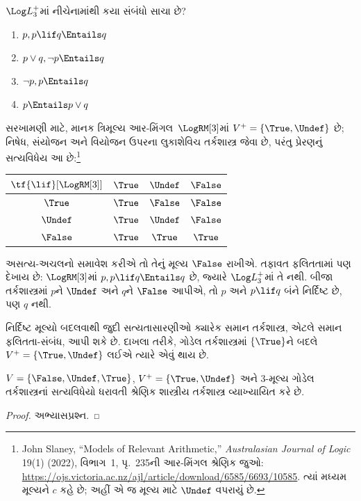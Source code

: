 \documentclass[../../../include/open-logic-section]{subfiles}
\begin{document}
\begin{prob}
  $\Log L_3^{+}$માં નીચેનામાંથી કયા સંબંધો સાચા છે?
  \begin{enumerate}
    \item $p, p \lif q \Entails q$
    \item $p \lor q, \lnot p \Entails q$
    \item $\lnot p, p \Entails q$
    \item $p \Entails p \lor q$
  \end{enumerate}
\end{prob}

સરખામણી માટે, માનક ત્રિમૂલ્ય આર-મિંગલ~$\LogRM[3]$માં
$V^+=\{\True,\Undef\}$ છે; નિષેધ, સંયોજન અને વિયોજન
ઉપરના લુકાશેવિચ તર્કશાસ્ત્ર જેવા છે, પરંતુ પ્રેરણનું
સત્યવિધેય આ છે:\footnote{John Slaney, “Models of Relevant
Arithmetic,” \emph{Australasian Journal of Logic} 19(1)
(2022), વિભાગ~1, પૃ.~235ની આર-મિંગલ શ્રેણિક જુઓ:
\url{https://ojs.victoria.ac.nz/ajl/article/download/6585/6693/10585}.
ત્યાં મધ્યમ મૂલ્યને $c$ કહે છે; અહીં એ જ મૂલ્ય માટે
$\Undef$ વપરાયું છે.}
\begin{center}
  \begin{tabular}{c|ccc}
    $\tf{\lif}[\LogRM[3]]$ & $\True$ & $\Undef$ & $\False$\\
    \hline
    $\True$ & $\True$ & $\False$ & $\False$\\
    $\Undef$ & $\True$ & $\Undef$ & $\False$\\
    $\False$ & $\True$ & $\True$ & $\True$
  \end{tabular}
\end{center}
અસત્ય-અચલનો સમાવેશ કરીએ તો તેનું મૂલ્ય $\False$ રાખીએ.
તફાવત ફલિતતામાં પણ દેખાય છે: $\LogRM[3]$માં
$p,p\lif q\Entails q$ છે, જ્યારે $\Log L_3^{+}$માં તે નથી.
બીજા તર્કશાસ્ત્રમાં $p$ને $\Undef$ અને $q$ને $\False$ આપીએ,
તો $p$ અને $p\lif q$ બંને નિર્દિષ્ટ છે, પણ $q$ નથી.

નિર્દિષ્ટ મૂલ્યો બદલવાથી જુદી સત્યતાસારણીઓ ક્યારેક સમાન
તર્કશાસ્ત્ર, એટલે સમાન ફલિતતા-સંબંધ, આપી શકે છે. દાખલા તરીકે,
ગોડેલ તર્કશાસ્ત્રમાં $\{\True\}$ને બદલે
$V^+ = \{\True, \Undef\}$ લઈએ ત્યારે એવું થાય છે.

\begin{prop}
  $V = \{\False, \Undef,\True\}$, $V^+=\{\True,
  \Undef\}$ અને $3$-મૂલ્ય ગોડેલ તર્કશાસ્ત્રનાં સત્યવિધેયો ધરાવતી
  શ્રેણિક શાસ્ત્રીય તર્કશાસ્ત્ર વ્યાખ્યાયિત કરે છે.
\end{prop}

\begin{proof}
  અભ્યાસપ્રશ્ન.
\end{proof}
\end{document}
